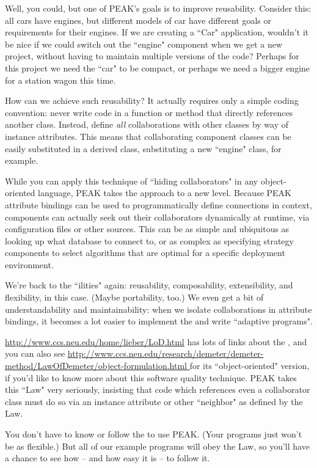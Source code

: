 Well, you could, but one of PEAK's goals is to improve reusability.  Consider
this: all cars have engines, but different models of car have different goals
or requirements for their engines.  If we are creating a ``Car" application,
wouldn't it be nice if we could switch out the ``engine" component when we
get a new project, without having to maintain multiple versions of the code?
Perhaps for this project we need the ``car" to be compact, or perhaps we need
a bigger engine for a station wagon this time.

How can we achieve such reusability?  It actually requires only a simple
coding convention: never write code in a function or method that directly
references another class.  Instead, define \emph{all} collaborations with
other classes by way of instance attributes.  This means that collaborating
component classes can be easily substituted in a derived class, substituting
a new ``engine" class, for example.






While you can apply this technique of ``hiding collaborators" in any
object-oriented language, PEAK takes the approach to a new level.  Because
PEAK attribute bindings can be used to programmatically define connections in
context, components can actually seek out their collaborators dynamically at
runtime, via configuration files or other sources.  This can be as simple
and ubiquitous as looking up what database to connect to, or as complex as
specifying strategy components to select algorithms that are optimal
for a specific deployment environment.

We're back to the ``ilities" again: reusability, composability, extensibility,
and flexibility, in this case.  (Maybe portability, too.)  We even get a bit
of understandability and maintainability: when we isolate collaborations in
attribute bindings, it becomes a lot easier to implement the  and write ``adaptive programs".

\vfill

\begin{seealso}

\url{http://www.ccs.neu.edu/home/lieber/LoD.html} has lots of links about the
, and you can also see
\url{http://www.ccs.neu.edu/research/demeter/demeter-method/LawOfDemeter/object-formulation.html
} for its ``object-oriented" version, if you'd like to know more about this
software quality technique.  PEAK takes this ``Law" very seriously, insisting
that code which references even a collaborator class must do so via an
instance attribute or other ``neighbor" as defined by the Law.

You don't have to know or follow the  to use PEAK.
(Your programs just won't be as flexible.)  But all of our example programs
will obey the Law, so you'll have a chance to see how -- and how easy it
is -- to follow it.

\end{seealso}

